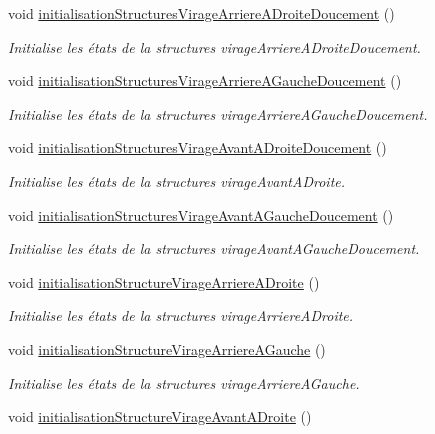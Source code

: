 \begin{DoxyCompactItemize}
void \hyperlink{class_manette_a118d9481c3eecb4dcc58f8798893fa85}{initialisation\+Structures\+Virage\+Arriere\+A\+Droite\+Doucement} ()
\begin{DoxyCompactList}\small\item\em Initialise les états de la structures virage\+Arriere\+A\+Droite\+Doucement. \end{DoxyCompactList}\item 
void \hyperlink{class_manette_a345202d80c6b1370284103878e690363}{initialisation\+Structures\+Virage\+Arriere\+A\+Gauche\+Doucement} ()
\begin{DoxyCompactList}\small\item\em Initialise les états de la structures virage\+Arriere\+A\+Gauche\+Doucement. \end{DoxyCompactList}\item 
void \hyperlink{class_manette_ac77d5caae62d9248edd5e26f15176f34}{initialisation\+Structures\+Virage\+Avant\+A\+Droite\+Doucement} ()
\begin{DoxyCompactList}\small\item\em Initialise les états de la structures virage\+Avant\+A\+Droite. \end{DoxyCompactList}\item 
void \hyperlink{class_manette_ac01c5ff122f042497658f00d3df9e859}{initialisation\+Structures\+Virage\+Avant\+A\+Gauche\+Doucement} ()
\begin{DoxyCompactList}\small\item\em Initialise les états de la structures virage\+Avant\+A\+Gauche\+Doucement. \end{DoxyCompactList}\item 
void \hyperlink{class_manette_a9097a15ce44cb2535ce6e6099a8b2095}{initialisation\+Structure\+Virage\+Arriere\+A\+Droite} ()
\begin{DoxyCompactList}\small\item\em Initialise les états de la structures virage\+Arriere\+A\+Droite. \end{DoxyCompactList}\item 
void \hyperlink{class_manette_ad1d146fe52ff367fd2a7fe3c94c165e4}{initialisation\+Structure\+Virage\+Arriere\+A\+Gauche} ()
\begin{DoxyCompactList}\small\item\em Initialise les états de la structures virage\+Arriere\+A\+Gauche. \end{DoxyCompactList}\item 
void \hyperlink{class_manette_ad41918ccfeee9d80146a74678173cee8}{initialisation\+Structure\+Virage\+Avant\+A\+Droite} ()

\end{DoxyCompactItemize}
